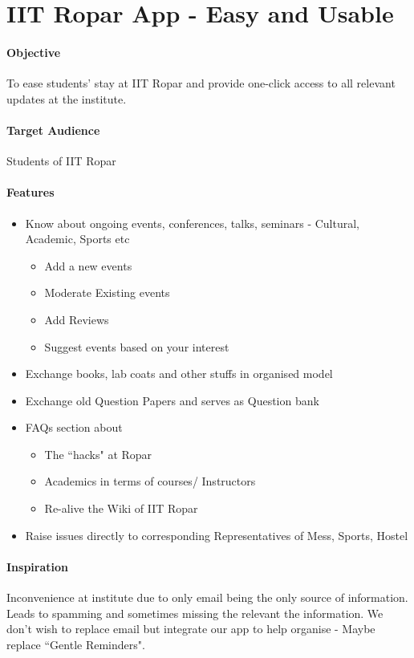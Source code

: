 \documentclass{article}
\begin{document}
\vspace{1cm}

\section{IIT Ropar App - Easy and Usable}
\paragraph{Objective}
To ease students' stay at IIT Ropar and provide one-click access to all relevant updates at the institute.
\paragraph{Target Audience}
Students of IIT Ropar
\paragraph{Features}
\begin{itemize}
    \item Know about ongoing events, conferences, talks, seminars - Cultural, Academic, Sports etc
    \begin{itemize}
        \item Add a new events
        \item Moderate Existing events
        \item Add Reviews
        \item Suggest events based on your interest
    \end{itemize}
    \item Exchange books, lab coats and other stuffs in organised model
    \item Exchange old Question Papers and serves as Question bank
    \item FAQs section about
    \begin{itemize}
        \item The ``hacks" at Ropar
        \item Academics in terms of courses/ Instructors
        \item Re-alive the Wiki of IIT Ropar
    \end{itemize}
    \item Raise issues directly to corresponding Representatives of Mess, Sports, Hostel
\end{itemize}
\paragraph{Inspiration}
Inconvenience at institute due to only email being the only source of information. Leads to spamming and sometimes missing the relevant the information. We don't wish to replace email but integrate our app to help organise - Maybe replace ``Gentle Reminders".
\end{document}
